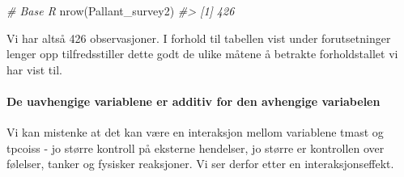 \documentclass[
]{article}
\newenvironment{Shaded}{\begin{snugshade}}{\end{snugshade}}
\newcommand{\CommentTok}[1]{\textcolor[rgb]{0.56,0.35,0.01}{\textit{#1}}}
\newcommand{\FunctionTok}[1]{\textcolor[rgb]{0.00,0.00,0.00}{#1}}
\newcommand{\NormalTok}[1]{#1}
\begin{document}
\begin{Shaded}
\begin{Highlighting}[]
\CommentTok{\# Base R}
\FunctionTok{nrow}\NormalTok{(Pallant\_survey2)}
\CommentTok{\#\textgreater{} [1] 426}
\end{Highlighting}
\end{Shaded}

Vi har altså 426 observasjoner. I forhold til tabellen vist under forutsetninger lenger opp tilfredsstiller dette godt de ulike måtene å betrakte forholdstallet vi har vist til.

\hypertarget{de-uavhengige-variablene-er-additiv-for-den-avhengige-variabelen-2}{%
\paragraph{De uavhengige variablene er additiv for den avhengige variabelen}\label{de-uavhengige-variablene-er-additiv-for-den-avhengige-variabelen-2}}

Vi kan mistenke at det kan være en interaksjon mellom variablene tmast og tpcoiss - jo større kontroll på eksterne hendelser, jo større er kontrollen over følelser, tanker og fysisker reaksjoner. Vi ser derfor etter en interaksjonseffekt.
\end{document}
